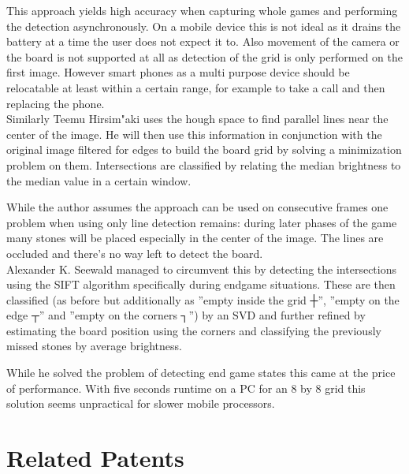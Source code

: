 	This approach yields high accuracy when capturing whole games and performing the detection asynchronously. On a mobile device this is not ideal as it drains the battery at a time the user does not expect it to. Also movement of the camera or the board is not supported at all as detection of the grid is only performed on the first image. However smart phones as a multi purpose device should be relocatable at least within a certain range, for example to take a call and then replacing the phone.
	\\

	Similarly Teemu Hirsim"aki \cite{hirsimaki2005extracting} uses the hough space to find parallel lines near the center of the image. He will then use this information in conjunction with the original image filtered for edges to build the board grid by solving a minimization problem on them. Intersections are classified by relating the median brightness to the median value in a certain window.

	While the author assumes the approach can be used on consecutive frames one problem when using only line detection remains: during later phases of the game many stones will be placed especially in the center of the image. The lines are occluded and there's no way left to detect the board.
	\\

	Alexander K. Seewald \cite{seewald2010automatic} managed to circumvent this by detecting the intersections using the SIFT algorithm specifically during endgame situations. These are then classified (as before but additionally as ''empty inside the grid ┼'', ''empty on the edge ┬'' and ''empty on the corners ┐'') by an SVD and further refined by estimating the board position using the corners and classifying the previously missed stones by average brightness.

	While he solved the problem of detecting end game states this came at the price of performance. With five seconds runtime on a PC for an 8 by 8 grid this solution seems unpractical for slower mobile processors.

	\section{Related Patents}
	\label{introduction-patents}

